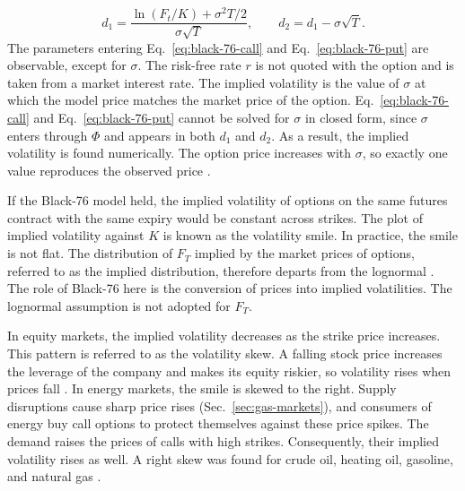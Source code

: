 \begin{equation}
d_1 = \frac{\ln(F_t/K) + \sigma^2 T/2}{\sigma \sqrt{T}}, \qquad
d_2 = d_1 - \sigma \sqrt{T}.
\end{equation}
The parameters entering Eq.~\eqref{eq:black-76-call} and Eq.~\eqref{eq:black-76-put} are observable, except for $\sigma$. The risk-free rate $r$ is not quoted with the option and is taken from a market interest rate. The implied volatility is the value of $\sigma$ at which the model price matches the market price of the option. Eq.~\eqref{eq:black-76-call} and Eq.~\eqref{eq:black-76-put} cannot be solved for $\sigma$ in closed form, since $\sigma$ enters through $\Phi$ and appears in both $d_1$ and $d_2$. As a result, the implied volatility is found numerically. The option price increases with $\sigma$, so exactly one value reproduces the observed price \parencite[358]{hullOptionsFuturesOther2022}.

If the Black-76 model held, the implied volatility of options on the same futures contract with the same expiry would be constant across strikes. The plot of implied volatility against $K$ is known as the volatility smile. In practice, the smile is not flat. The distribution of $F_T$ implied by the market prices of options, referred to as the implied distribution, therefore departs from the lognormal \parencite[101--102]{gemanCommoditiesCommodityDerivatives2005}. The role of Black-76 here is the conversion of prices into implied volatilities. The lognormal assumption is not adopted for $F_T$.

In equity markets, the implied volatility decreases as the strike price increases. This pattern is referred to as the volatility skew. A falling stock price increases the leverage of the company and makes its equity riskier, so volatility rises when prices fall \parencite[456]{hullOptionsFuturesOther2022}.
In energy markets, the smile is skewed to the right. Supply disruptions cause sharp price rises (Sec.~\ref{sec:gas-markets}), and consumers of energy buy call options to protect themselves against these price spikes. The demand raises the prices of calls with high strikes. Consequently, their implied volatility rises as well. A right skew was found for crude oil, heating oil, gasoline, and natural gas \parencite[105]{gemanCommoditiesCommodityDerivatives2005}. 